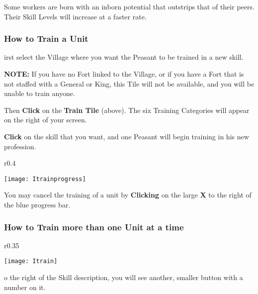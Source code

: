 Some workers are born with an inborn potential that outstrips that of their peers. Their Skill Levels will increase at a faster rate.

\subsubsection{\textsf{How to Train a Unit}}

irst select the Village where you want the Peasant to be trained in a new skill.

\textbf{NOTE:} If you have no Fort linked to the Village, or if you have a Fort that is not staffed with a General or King, this Tile will not be available, and you will be unable to train anyone.

Then \textbf{Click} on the \textbf{Train Tile} (above). The six Training Categories will appear on the right of your screen.

\textbf{Click} on the skill that you want, and one Peasant will begin training in his new profession.

\begin{wrapfigure}{r}{0.4\textwidth}
    \vspace{-20pt}
    \begin{center}
        \texttt{[image: Itrainprogress]} %
    \end{center}
    \vspace{-15pt}
\end{wrapfigure}

You may cancel the training of a unit by \textbf{Clicking} on the large \textbf{X} to the right of the blue progress bar.

\subsubsection{\textsf{How to Train more than one Unit at a time}}

\begin{wrapfigure}{r}{0.35\textwidth}
    \vspace{-20pt}
    \begin{center}
        \texttt{[image: Itrain]} %
    \end{center}
    \vspace{-20pt}
\end{wrapfigure}

o the right of the Skill description, you will see another, smaller button with a number on it.

